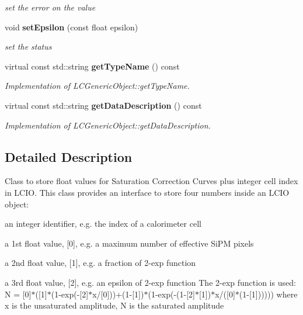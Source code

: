\begin{DoxyCompactItemize}
\begin{DoxyCompactList}\small\item\em set the error on the value \item\end{DoxyCompactList}\item 
void {\bf setEpsilon} (const float epsilon)\label{classCALICE_1_1SaturationParameters_a30a1dfd7727fbc4d06daed2ac90cbf80}

\begin{DoxyCompactList}\small\item\em set the status \item\end{DoxyCompactList}\item 
virtual const std::string {\bf getTypeName} () const \label{classCALICE_1_1SaturationParameters_a002bce0457608d0922e5c9c8d681e780}

\begin{DoxyCompactList}\small\item\em Implementation of LCGenericObject::getTypeName. \item\end{DoxyCompactList}\item 
virtual const std::string {\bf getDataDescription} () const \label{classCALICE_1_1SaturationParameters_a093e3b01f25cbb982a7ee779198e1280}

\begin{DoxyCompactList}\small\item\em Implementation of LCGenericObject::getDataDescription. \item\end{DoxyCompactList}\end{DoxyCompactItemize}


\subsection{Detailed Description}
Class to store float values for Saturation Correction Curves plus integer cell index in LCIO. This class provides an interface to store four numbers inside an LCIO object:
\begin{DoxyItemize}
\item an integer identifier, e.g. the index of a calorimeter cell
\item a 1st float value, [0], e.g. a maximum number of effective SiPM pixels
\item a 2nd float value, [1], e.g. a fraction of 2-\/exp function
\item a 3rd float value, [2], e.g. an epsilon of 2-\/exp function The 2-\/exp function is used: N = [0]$\ast$([1]$\ast$(1-\/exp(-\/[2]$\ast$x/[0]))+(1-\/[1])$\ast$(1-\/exp(-\/(1-\/[2]$\ast$[1])$\ast$x/([0]$\ast$(1-\/[1]))))) where x is the unsaturated amplitude, N is the saturated amplitude
\end{DoxyItemize}

